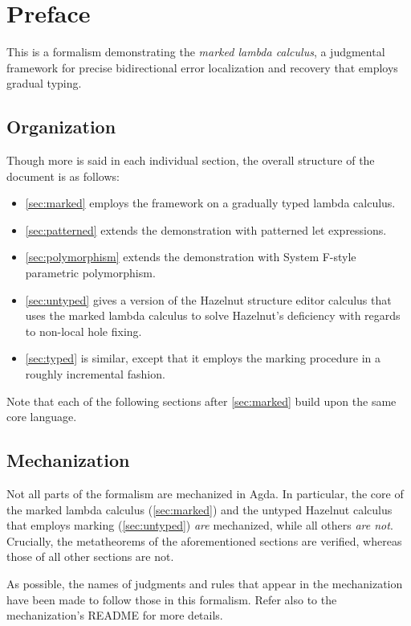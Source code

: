 \documentclass[formalism.tex]{subfiles}
\begin{document}
\section{Preface}
\label{sec:preface}
This is a formalism demonstrating the \emph{marked lambda calculus}, a judgmental framework for
precise bidirectional error localization and recovery that employs gradual typing.

\subsection{Organization}
Though more is said in each individual section, the overall structure of the document is as follows:
%
\begin{itemize}
  \item \cref{sec:marked} employs the framework on a gradually typed lambda calculus.

  \item \cref{sec:patterned} extends the demonstration with patterned let expressions.

  \item \cref{sec:polymorphism} extends the demonstration with System F-style parametric
    polymorphism.

  \item \cref{sec:untyped} gives a version of the Hazelnut structure editor calculus that uses the
    marked lambda calculus to solve Hazelnut's deficiency with regards to non-local hole fixing.

  \item \cref{sec:typed} is similar, except that it employs the marking procedure in a roughly
    incremental fashion.
\end{itemize}
%
Note that each of the following sections after \cref{sec:marked} build upon the same core language.

\subsection{Mechanization}
Not all parts of the formalism are mechanized in Agda. In particular, the core of the marked lambda
calculus (\cref{sec:marked}) and the untyped Hazelnut calculus that employs marking
(\cref{sec:untyped}) \emph{are} mechanized, while all others \emph{are not}. Crucially, the
metatheorems of the aforementioned sections are verified, whereas those of all other sections are
not.

As possible, the names of judgments and rules that appear in the mechanization have been made to
follow those in this formalism. Refer also to the mechanization's README for more details.
\end{document}
